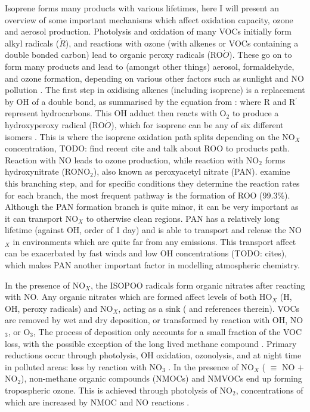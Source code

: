    Isoprene forms many products with various lifetimes, here I will present an overview of some important mechanisms which affect oxidation capacity, ozone and aerosol production.
    Photolysis and oxidation of many VOCs initially form alkyl radicals ($\dot{R}$), and reactions with ozone (with alkenes or VOCs containing a double bonded carbon) lead to organic peroxy radicals (RO$\dot{O}$). 
    These go on to form many products and lead to (amongst other things) aerosol, formaldehyde, and ozone formation, depending on various other factors such as sunlight and NO pollution \citep{Atkinson2000}.
    The first step in oxidising alkenes (including isoprene) is a replacement by OH of a double bond, as summarised by the equation from \cite{Patchen2007}:
    where R and R$^{\prime}$ represent hydrocarbons.
    This OH adduct then reacts with O$_2$ to produce a hydroxyperoxy radical (RO$\dot{O}$), which for isoprene can be any of six different isomers \citep{Patchen2007}.
    This is where the isoprene oxidation path splits depending on the NO$_X$ concentration, TODO: find recent cite and talk about ROO to products path.
    Reaction with NO leads to ozone production, while reaction with NO$_2$ forms hydroxynitrate (RONO$_2$), also known as peroxyacetyl nitrate (PAN).
    \cite{Patchen2007} examine this branching step, and for specific conditions they determine the reaction rates for each branch, the most frequent pathway is the formation of ROO (99.3\%).
    Although the PAN formation branch is quite minor, it can be very important as it can transport NO$_X$ to otherwise clean regions.
    PAN has a relatively long lifetime (against OH, order of 1 day) and is able to transport and release the NO$_X$ in environments which are quite far from any emissions.
    This transport affect can be exacerbated by fast winds and low OH concentrations (TODO: cites), which makes PAN another important factor in modelling atmospheric chemistry.
    
    In the presence of NO$_X$, the ISOPOO radicals form organic nitrates after reacting with NO.
    Any organic nitrates which are formed affect levels of both HO$_X$ (H, OH, peroxy radicals) and NO$_X$, acting as a sink (\cite{Mao2013} and references therein).
    VOCs are removed by wet and dry deposition, or transformed by reaction with OH, NO$_3$, or O$_3$,
    The process of deposition only accounts for a small fraction of the VOC loss, with the possible exception of the long lived methane compound \citep{AtkinsonArey2003}.
    Primary reductions occur through photolysis, OH oxidation, ozonolysis, and at night time in polluted areas: loss by reaction with NO$_3$ \citep{AtkinsonArey2003, Brown2009}.
    In the presence of NO$_X$ ( $\equiv $ NO $+$ NO$_2$), non-methane organic compounds (NMOCs) and NMVOCs end up forming tropospheric ozone.
    This is achieved through photolysis of NO$_2$, concentrations of which are increased by NMOC and NO reactions \citep{AtkinsonArey2003}.
    
